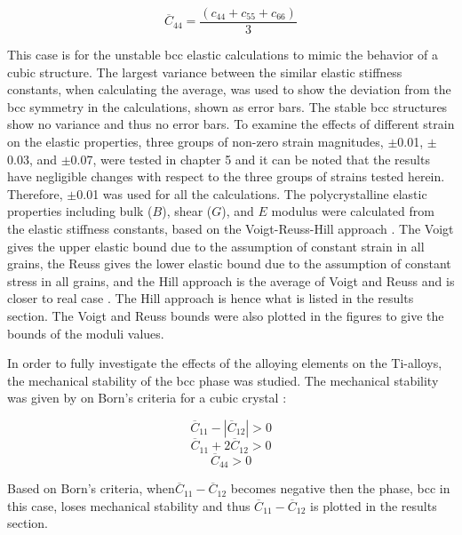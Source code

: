 \begin{equation}
\label{eq: averagec44}
\overline{C}_{44} = \frac{(c_{44} + c_{55} + c_{66})}{3}
\end{equation}

\noindent This case is for the unstable bcc elastic calculations to mimic the behavior of a cubic structure. The largest variance between the similar elastic stiffness constants, when calculating the average, was used to show the deviation from the bcc symmetry in the calculations, shown as error bars. The stable bcc structures show no variance and thus no error bars. To examine the effects of different strain on the elastic properties, three groups of non-zero strain magnitudes, $\pm$0.01, $\pm$0.03, and $\pm$0.07, were tested in chapter 5 and it can be noted that the results have negligible changes with respect to the three groups of strains tested herein. Therefore, $\pm$0.01 was used for all the calculations. The polycrystalline elastic properties including bulk ($B$), shear ($G$), and $E$ modulus were calculated from the elastic stiffness constants, based on the Voigt-Reuss-Hill approach \cite{Simmons1971b}. The Voigt gives the upper elastic bound due to the assumption of constant strain in all grains, the Reuss gives the lower elastic bound due to the assumption of constant stress in all grains, and the Hill approach is the average of Voigt and Reuss and is closer to real case \cite{Zuo1993,Chung1967}. The Hill approach is hence what is listed in the results section. The Voigt and Reuss bounds were also plotted in the figures to give the bounds of the moduli values.

In order to fully investigate the effects of the alloying elements on the Ti-alloys, the mechanical stability of the bcc phase was studied. The mechanical stability was given by on Born's criteria for a cubic crystal  \cite{Born1998,Nye1985}:


\begin{equation}
\label{eq: born1}
\overline{C}_{11} -|\overline{C}_{12}| > 0
\end{equation}
\begin{equation}
\label{eq: born2}
\overline{C}_{11} + 2\overline{C}_{12} > 0
\end{equation}
\begin{equation}
\label{eq: born3}
\overline{C}_{44} > 0
\end{equation}

\noindent Based on Born's criteria, when$\overline{C}_{11} - \overline{C}_{12}$ becomes negative then the phase, bcc in this case, loses mechanical stability and thus $\overline{C}_{11} - \overline{C}_{12}$ is plotted in the results section.

